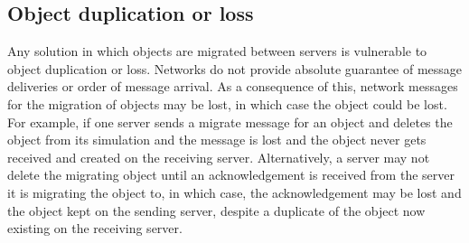 \subsection{Object duplication or loss}
Any solution in which objects are migrated between servers is vulnerable to object duplication or loss. Networks do not provide absolute guarantee of message deliveries or order of message arrival. As a consequence of this, network messages for the migration of objects may be lost, in which case the object could be lost. For example, if one server sends a migrate message for an object and deletes the object from its simulation and the message is lost and the object never gets received and created on the receiving server. Alternatively, a server may not delete the migrating object until an acknowledgement is received from the server it is migrating the object to, in which case, the acknowledgement may be lost and the object kept on the sending server, despite a duplicate of the object now existing on the receiving server. %



